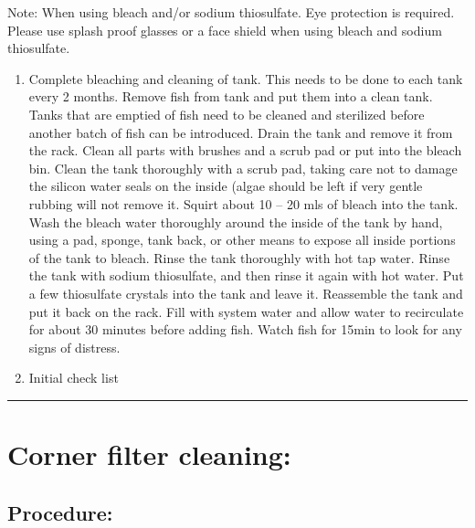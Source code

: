 \documentclass[
]{book}
\providecommand{\tightlist}{%
  \setlength{\itemsep}{0pt}\setlength{\parskip}{0pt}}
\begin{document}
Note: When using bleach and/or sodium thiosulfate. Eye protection is required. Please use splash proof glasses or a face shield when using bleach and sodium thiosulfate.

\begin{enumerate}
\def\labelenumi{\arabic{enumi}.}
\setcounter{enumi}{3}
\tightlist
\item
  Complete bleaching and cleaning of tank. This needs to be done to each tank every 2 months. Remove fish from tank and put them into a clean tank. Tanks that are emptied of fish need to be cleaned and sterilized before another batch of fish can be introduced. Drain the tank and remove it from the rack. Clean all parts with brushes and a scrub pad or put into the bleach bin. Clean the tank thoroughly with a scrub pad, taking care not to damage the silicon water seals on the inside (algae should be left if very gentle rubbing will not remove it. Squirt about 10 -- 20 mls of bleach into the tank. Wash the bleach water thoroughly around the inside of the tank by hand, using a pad, sponge, tank back, or other means to expose all inside portions of the tank to bleach. Rinse the tank thoroughly with hot tap water. Rinse the tank with sodium thiosulfate, and then rinse it again with hot water. Put a few thiosulfate crystals into the tank and leave it. Reassemble the tank and put it back on the rack. Fill with system water and allow water to recirculate for about 30 minutes before adding fish. Watch fish for 15min to look for any signs of distress.
\item
  Initial check list
\end{enumerate}

\begin{center}\rule{0.5\linewidth}{0.5pt}\end{center}

\hypertarget{corner-filter-cleaning}{%
\section{Corner filter cleaning:}\label{corner-filter-cleaning}}

\hypertarget{procedure-7}{%
\subsection{Procedure:}\label{procedure-7}}
\end{document}
